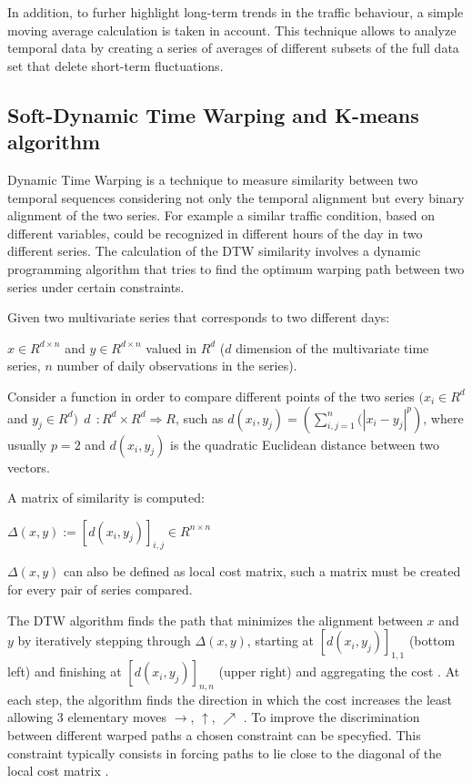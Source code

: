 \documentclass[11pt]{article}
\begin{document}
In addition, to furher highlight long-term trends in the traffic
behaviour, a simple moving average calculation is taken in account. This
technique allows to analyze temporal data by creating a series of
averages of different subsets of the full data set that delete
short-term fluctuations.

    \subsection{Soft-Dynamic Time Warping and K-means algorithm}

    Dynamic Time Warping is a technique to measure similarity between two
temporal sequences considering not only the temporal alignment but every
binary alignment of the two series. For example a similar traffic
condition, based on different variables, could be recognized in
different hours of the day in two different series. The calculation of
the DTW similarity involves a dynamic programming algorithm that tries
to find the optimum warping path between two series under certain
constraints.

Given two multivariate series that corresponds to two different days:

\(x \in R^{d \times n}\) and \(y \in R^{d \times n}\) valued in \(R^d\)
(\(d\) dimension of the multivariate time series, \(n\) number of daily
observations in the series).

Consider a function in order to compare different points of the two
series \((x_i \in R^{d}\) and
\(y_j \in R^{d}) \ \ d \ \ : R^d × R^d \Rightarrow R\), such as
\(d(x_i, y_j)= (\sum_{i,j=1}^n{(|x_i - y_j|^p})\), where usually \(p=2\)
and \(d(x_i, y_j)\) is the quadratic Euclidean distance between two
vectors.

A matrix of similarity is computed:

\(\Delta(x,y) := [d(x_i,y_j)]_{i,j} \in R^{n \times n}\)

\(\Delta(x,y)\) can also be defined as local cost matrix, such a matrix
must be created for every pair of series compared.

The DTW algorithm finds the path that minimizes the alignment between
\(x\) and \(y\) by iteratively stepping through \(\Delta(x,y)\),
starting at \([d(x_i,y_j)]_{1,1}\) (bottom left) and finishing at
\([d(x_i,y_j)]_{n,n}\) (upper right) and aggregating the cost
\cite{sarda2017comparing} . At each step, the algorithm finds the
direction in which the cost increases the least allowing 3 elementary
moves \(\rightarrow\), \(\uparrow\), \(\nearrow\) . To improve the
discrimination between different warped paths a chosen constraint can be
specyfied. This constraint typically consists in forcing paths to lie
close to the diagonal of the local cost matrix \cite{sakoe1978dynamic} .
\end{document}
